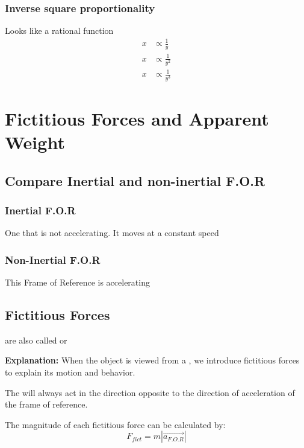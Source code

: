\subsubsection*{Inverse square proportionality}
Looks like a rational function\\
\begin{align*}
    x &\propto \frac{1}{y}\\
    x &\propto \frac{1}{y^2}\\
    x &\propto \frac{1}{y^3}
\end{align*}

\newpage
\section{Fictitious Forces and Apparent Weight}
\subsection{Compare Inertial and non-inertial F.O.R}
\subsubsection{Inertial F.O.R}
One that is not accelerating. It moves at a constant speed\\

\subsubsection{Non-Inertial F.O.R}
This Frame of Reference is accelerating
\subsection{Fictitious Forces}
 are also called  or 

\begin{redblock}
    \textbf{Explanation:} When the object is viewed from a , we introduce fictitious forces to explain its motion and behavior.
\end{redblock}

The  will always act in the direction opposite to the direction of acceleration of 
the frame of reference.\\

\begin{cyanblock}
    The magnitude of each fictitious force can be calculated by:
    \[
        F_{fict} = m|\vec{a_{F.O.R}}|
    \]
\end{cyanblock}

